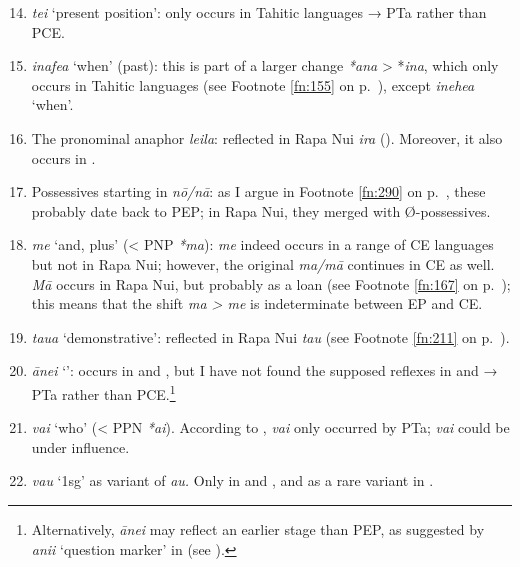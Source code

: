 \begin{enumerate}
\setcounter{enumi}{13}
\item 
\textit{tei} ‘present position’: only occurs in Tahitic languages → PTa rather than PCE.   

\item 
\textit{inafea} ‘when’ (past): this is part of a larger change \textit{*ana} {\textgreater} *\textit{ina}, which only occurs in Tahitic languages (see Footnote \ref{fn:155} on p.~\pageref{fn:155}), except  \textit{inehea} ‘when’.   

\item 
The pronominal anaphor \textit{leila}: reflected in Rapa Nui \textit{ira} (). Moreover, it also occurs in  \citep[45]{Pawley1966}.   

\item 
Possessives starting in \textit{nō/nā}: as I argue in Footnote \ref{fn:290} on p.~\pageref{fn:290}, these probably date back to PEP; in Rapa Nui, they merged with Ø-possessives.   

\item 
\textit{me} ‘and, plus’ ({\textless} PNP \textit{*ma}): \textit{me} indeed occurs in a range of CE languages but not in Rapa Nui; however, the original \textit{ma/mā} continues in CE as well. \textit{Mā} occurs in Rapa Nui, but probably as a  loan (see Footnote \ref{fn:167} on p.~\pageref{fn:167}); this means that the shift \textit{ma {\textgreater} me} is indeterminate between EP and CE.   

\item 
\textit{taua} ‘demonstrative’: reflected in Rapa Nui \textit{tau} (see Footnote \ref{fn:211} on p.~\pageref{fn:211}).  

\item 
\textit{ānei} ‘’: occurs in  and , but I have not found the supposed reflexes in  and  → PTa rather than PCE.\footnote{\label{fn:15}Alternatively, \textit{ānei} may reflect an earlier stage than PEP, as suggested by \textit{anii} ‘question marker’ in  (see \citealt[23]{Moyle2011}).}   

\item 
\textit{vai} ‘who’ ({\textless} PPN \textit{*ai}). According to \citet[300]{Wilson2012}, \textit{vai} only occurred by PTa;  \textit{vai} could be under  influence.   

\item 
\textit{vau} ‘1sg’ as variant of \textit{au.} Only in  and , and as a rare variant in .   

\end{enumerate}

